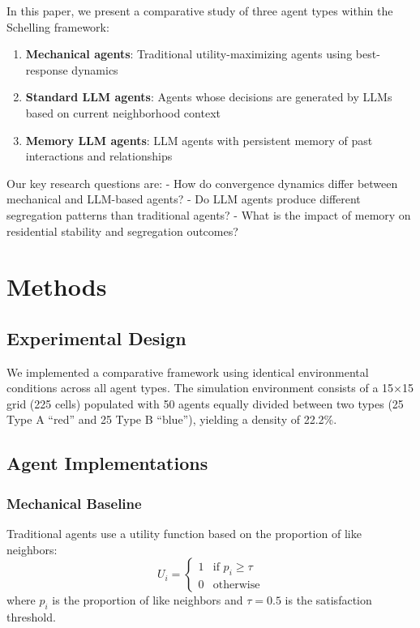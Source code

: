 \documentclass[
  11pt,
]{article}
\providecommand{\tightlist}{%
  \setlength{\itemsep}{0pt}\setlength{\parskip}{0pt}}\usepackage{longtable,booktabs,array}
\begin{document}
In this paper, we present a comparative study of three agent types
within the Schelling framework:

\begin{enumerate}
\def\labelenumi{\arabic{enumi}.}
\tightlist
\item
  \textbf{Mechanical agents}: Traditional utility-maximizing agents
  using best-response dynamics
\item
  \textbf{Standard LLM agents}: Agents whose decisions are generated by
  LLMs based on current neighborhood context
\item
  \textbf{Memory LLM agents}: LLM agents with persistent memory of past
  interactions and relationships
\end{enumerate}

Our key research questions are: - How do convergence dynamics differ
between mechanical and LLM-based agents? - Do LLM agents produce
different segregation patterns than traditional agents? - What is the
impact of memory on residential stability and segregation outcomes?

\section{Methods}\label{methods}

\subsection{Experimental Design}\label{experimental-design}

We implemented a comparative framework using identical environmental
conditions across all agent types. The simulation environment consists
of a 15×15 grid (225 cells) populated with 50 agents equally divided
between two types (25 Type A ``red'' and 25 Type B ``blue''), yielding a
density of 22.2\%.

\subsection{Agent Implementations}\label{agent-implementations}

\subsubsection{Mechanical Baseline}\label{mechanical-baseline}

Traditional agents use a utility function based on the proportion of
like neighbors: \[U_i = \begin{cases} 
1 & \text{if } p_i \geq \tau \\
0 & \text{otherwise}
\end{cases}\] where \(p_i\) is the proportion of like neighbors and
\(\tau = 0.5\) is the satisfaction threshold.
\end{document}
